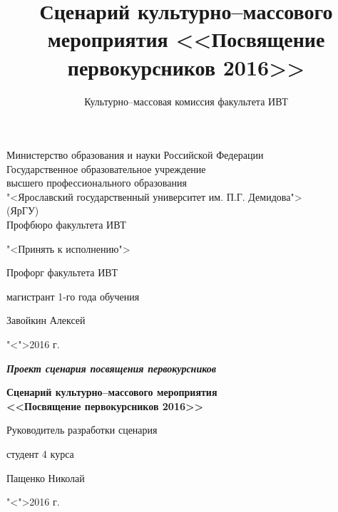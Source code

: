 \documentclass[a4paper, 14pt]{extarticle}
\title{Сценарий культурно--массового мероприятия <<Посвящение первокурсников 2016>>}
\author{Культурно--массовая комиссия факультета ИВТ}
\begin{document}
\setcounter{tocdepth}{3}





{
\thispagestyle{empty}

\begin{center}
	
	Министерство образования и науки Российской Федерации\\[0.3cm]
	Государственное образовательное учреждение\\
	высшего профессионального образования\\
	"<Ярославский государственный университет им. П.Г. Демидова">\\
	(ЯрГУ)\\[0.3cm]
	
	Профбюро факультета ИВТ
	
	\bigskip
	\bigskip	
	
	\hspace{15em}"<Принять к исполнению">
	
	\begin{flushright}
		Профорг факультета ИВТ\par
		магистрант 1-го года обучения\par
		\underline{\hspace{3.2cm}}Завойкин Алексей\par
		"<\underline{\hspace{0.5cm}}">\underline{\hspace{3.4cm}}2016 г.\par
	\end{flushright}
	
	\bigskip
	
	{\textbf
		{\textit
			{Проект сценария посвящения первокурсников}
		}
	}
	\\
	
	\bigskip
	\bigskip
	
	{\bf
		Сценарий культурно--массового мероприятия\\<<Посвящение первокурсников 2016>> 
	}
\end{center}

\medskip

\begin{flushright}
	Руководитель разработки сценария\par
	студент 4 курса\par
	\underline{\hspace{3.5cm}}Пащенко Николай\par
	"<\underline{\hspace{0.8cm}}">\underline{\hspace{3.5cm}}2016 г.\par
\end{flushright}

}
\end{document}
